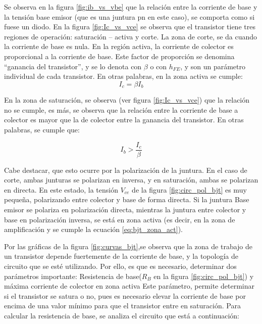 Se observa en la figura \ref{fig:ib_vs_vbe} que la relación entre la corriente de base y la tensión base emisor (que es una juntura pn en este caso), se comporta como si fuese un diodo.  En la figura \ref{fig:Ic_vs_vce} se observa que el transistor tiene tres regiones de operación: saturación – activa y corte. La zona de corte, se da cuando la corriente de base es nula. En la región activa, la corriente de colector es proporcional a la corriente de base. Este factor de proporción se denomina ``ganancia del transistor'', y se lo denota con $\beta$ o con $h_{FE}$, y son un parámetro individual de cada transistor. En otras palabras, en la zona activa se cumple: 
\begin{equation} \label{eq:bjt_zona_act}
	I_c = \beta I_b
\end{equation}

En la zona de saturación, se observa (ver figura \ref{fig:Ic_vs_vce}) que la relación no se cumple, es más, se observa que la relación entre la corriente de base a colector es mayor que la de colector entre la ganancia del transistor. En otras palabras, se cumple que: 	

\begin{equation}
	I_b > \frac{I_c}{\beta} 
\end{equation}

Cabe destacar, que esto ocurre por la polarización de la juntura. En el caso de corte, ambas junturas se polarizan en inversa, y en saturación, ambas se polarizan en directa. En este estado, la tensión $V_{ce}$ de la figura \ref{fig:circ_pol_bjt} es muy pequeña, polarizando entre colector y base de forma directa. Si la juntura Base emisor se polariza en polarización directa, mientras la juntura entre colector y base en polarización inversa, se está en zona activa (es decir, en la zona de amplificación y se cumple la ecuación \ref{eq:bjt_zona_act}). 


Por las gráficas de la figura \ref{fig:curvas_bjt},se observa que la zona de trabajo de un transistor depende fuertemente de la corriente de base, y la topología de circuito que se esté utilizando. Por ello, es que es necesario, determinar dos parámetros importante: Resistencia de base($R_B$ en la figura \ref{fig:circ_pol_bjt}) y máxima corriente de colector en zona activa Este parámetro, permite determinar si el transistor se satura o no, pues es necesario elevar la corriente de base por encima de una valor mínimo para que el transistor entre en saturación.  
Para calcular la resistencia de base, se analiza el circuito que está a continuación: 


